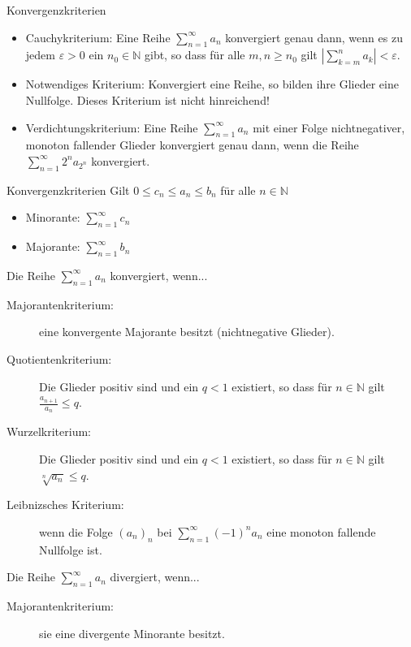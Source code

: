 \documentclass[notes=hide,hyperref={dvipdfmx,pdfpagelabels=false}]{beamer}
\begin{document}
\begin{frame}{Konvergenzkriterien}
\begin{itemize}
\item \alert{Cauchykriterium:} Eine Reihe $\sum_{n=1}^\infty a_n$ konvergiert
                  genau dann, wenn es zu jedem $\varepsilon>0$ ein $n_0
                  \in \mathbb{N}$ gibt, so dass für alle $m,n \geq n_0$
                  gilt $| \sum_{k=m}^n a_k|<\varepsilon$.
\item \alert{Notwendiges Kriterium:} Konvergiert eine Reihe, so bilden ihre Glieder eine Nullfolge. Dieses Kriterium ist \alert{nicht} hinreichend!
\item \alert{Verdichtungskriterium:} Eine Reihe $\sum_{n=1}^\infty a_n$ mit
                  einer Folge nichtnegativer, monoton fallender
                  Glieder konvergiert genau dann, wenn die Reihe
                  $\sum_{n=1}^\infty 2^n a_{2^n}$ konvergiert.
\end{itemize}
\end{frame}

\begin{frame}{Konvergenzkriterien}
Gilt $0 \leq c_n \leq a_n \leq b_n$ für alle $n \in \mathbb{N}$
\begin{itemize}
 \item {\color{red} Minorante}: $\sum_{n=1}^\infty c_n$
 \item {\color{red} Majorante}: $\sum_{n=1}^\infty b_n$ 
\end{itemize}
Die Reihe $\sum_{n=1}^\infty a_n$ \alert{konvergiert}, wenn...
\begin{description}
\item[Majorantenkriterium:] eine konvergente Majorante besitzt (nichtnegative Glieder).

\item[Quotientenkriterium:] Die Glieder positiv sind und ein $q<1$
existiert, so dass für $n \in \mathbb{N}$ gilt $\frac{a_{n+1}}{a_n}
\leq q$. 
\item[Wurzelkriterium:] Die Glieder positiv sind und ein $q<1$
existiert, so dass für $n \in \mathbb{N}$ gilt $\sqrt[n]{a_n} \leq
q$. 
\item[Leibnizsches Kriterium:] wenn die Folge $(a_n)_n$ bei $\sum_{n=1}^\infty (-1)^n a_n$
eine monoton fallende  Nullfolge ist.
\end{description}
Die Reihe $\sum_{n=1}^\infty a_n$ \alert{divergiert}, wenn...
\begin{description}
\item[Majorantenkriterium:] sie eine divergente Minorante besitzt.
\end{description}
\end{frame}
\end{document}
